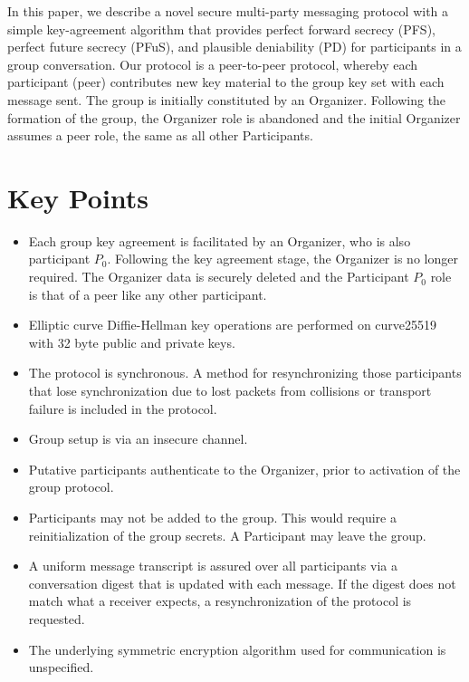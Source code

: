\documentclass[%
preprint,
amsmath,amssymb,
aps,
prb,
floatfix,
]{revtex4-1}
\begin{document}
In this paper, we describe a novel secure multi-party messaging protocol with a
simple key-agreement algorithm that provides perfect forward secrecy (PFS),
perfect future secrecy (PFuS),
and plausible deniability (PD) for participants in a group conversation. Our protocol
is a peer-to-peer protocol, whereby each
participant (peer) contributes new
key material to the group key set with each message sent. The group is
initially constituted by an Organizer. Following the formation of the group, the
Organizer role is abandoned and the initial Organizer assumes a peer role, the
same as all other Participants.

\section{\label{sec:keypoints}Key Points}
\begin{itemize}
\item Each group key agreement is facilitated by an Organizer, who is also
participant $P_0$. Following the key agreement stage, the Organizer is no longer
required. The Organizer data is securely deleted and the Participant
$P_0$ role is that of a peer like any other
participant.
\item Elliptic curve Diffie-Hellman key operations are performed on curve25519
with 32 byte
public and private keys.
\item The protocol is synchronous. A method for resynchronizing those
participants that lose synchronization due to lost packets from collisions or
transport failure is included in the protocol.
\item Group setup is via an insecure channel.
\item Putative participants authenticate to the Organizer, prior to
activation of the group protocol.
\item Participants may not be added to the group. This would
require a reinitialization of the group secrets. A Participant may leave the
group.
\item A uniform message transcript is assured over all participants via a
conversation digest that is updated with each message. If the digest does not
match what a receiver expects, a resynchronization of the protocol is requested.
\item The underlying symmetric encryption algorithm used for communication is
unspecified.
\end{itemize}
\end{document}

